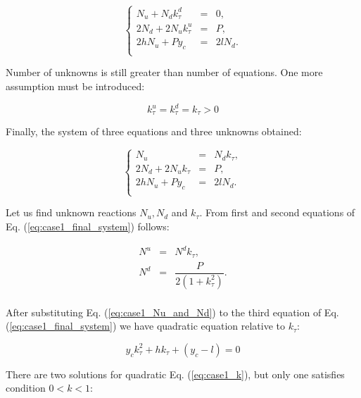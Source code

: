 \documentclass{ws-procs9x6}
\begin{document}
\begin{equation}
\label{eq:case1_subs_assumptions_1_and_2}
\left\{
\begin{array}{rcl}
  N_u + N_dk_\tau^d &=& 0, \\
  2N_d + 2N_uk_\tau^u &=& P, \\
  2hN_u + Py_c &=& 2lN_d.\\
\end{array}
\right.
\end{equation}
  
Number of unknowns is still greater than number of equations. One more assumption must be introduced:

\begin{equation}
  \label{eq:case1_assumption_3}
  k_\tau^u = k_\tau^d = k_\tau > 0
\end{equation}

Finally, the system of three equations and three unknowns obtained:

\begin{equation}
\label{eq:case1_final_system}
\left\{
\begin{array}{rcl}
  N_u &=& N_dk_\tau,\\  
  2N_d + 2N_uk_\tau &=& P,\\
  2hN_u + Py_c &=& 2lN_d.\\
\end{array}
\right.
\end{equation}

Let us find unknown reactions $N_u,N_d$ and $k_\tau$. From first and second equations of Eq. (\ref{eq:case1_final_system}) follows:

\begin{equation}
\label{eq:case1_Nu_and_Nd}
\begin{array}{rcl}
  N^u &=& N^dk_\tau,\\
  N^d &=& \dfrac{P}{2(1+k_\tau^2)}.\\
\end{array}
\end{equation}

After substituting Eq. (\ref{eq:case1_Nu_and_Nd}) to the third equation of Eq. (\ref{eq:case1_final_system}) we have quadratic equation relative to $k_\tau$:

\begin{equation}
\label{eq:case1_k}
y_ck_\tau^2+hk_\tau + (y_c-l) = 0
\end{equation}

There are two solutions for quadratic Eq. (\ref{eq:case1_k}), but only one satisfies condition $0<k<1$:
\end{document}
